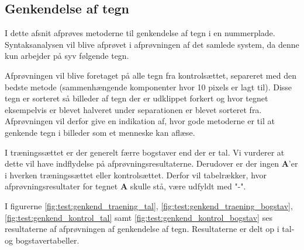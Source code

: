 
\subsection{Genkendelse af tegn}
I dette afsnit afprøves metoderne til genkendelse af tegn i en nummerplade. Syntaksanalysen vil blive afprøvet i afprøvningen af det samlede system, da denne kun arbejder på syv følgende tegn.

Afprøvningen vil blive foretaget på alle tegn fra kontrolsættet, separeret med den bedste metode (sammenhængende komponenter hvor 10 pixels er lagt til). Disse tegn er sorteret så billeder af tegn der er udklippet forkert og hvor tegnet eksempelvis er blevet halveret under separationen er blevet sorteret fra. Afprøvningen vil derfor give en indikation af, hvor gode metoderne er til at genkende tegn i billeder som et menneske kan aflæse.

I træningssættet er der generelt færre bogstaver end der er tal. Vi vurderer at dette vil have indflydelse på afprøvningsresultaterne. Derudover er der ingen \textbf{A}'er i hverken træningssættet eller kontrolsættet. Derfor vil tabelrækker, hvor afprøvningsresultater for tegnet \textbf{A} skulle stå, være udfyldt med "-".


I figurerne \vref{fig:test:genkend_traening_tal}, \vref{fig:test:genkend_traening_bogstav}, \vref{fig:test:genkend_kontrol_tal} samt \vref{fig:test:genkend_kontrol_bogstav} ses resultaterne af afprøvningen af genkendelse af tegn. Resultaterne er delt op i tal- og bogstavertabeller.

